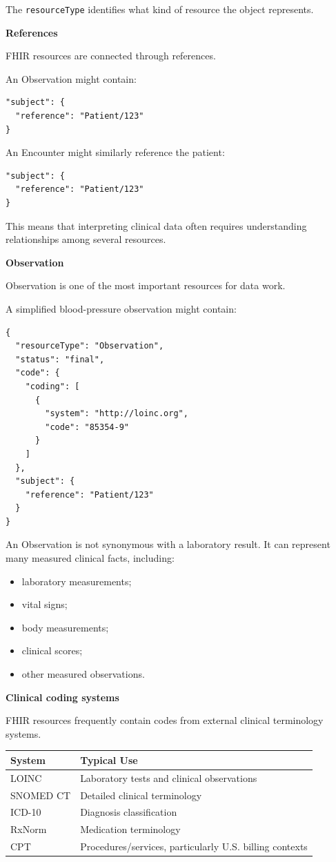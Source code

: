 \documentclass[11pt,letterpaper]{article}
\begin{document}
The \texttt{resourceType} identifies what kind of resource the object
represents.

\textbf{References}

FHIR resources are connected through references.

An Observation might contain:

\begin{lstlisting}
"subject": {
  "reference": "Patient/123"
}
\end{lstlisting}

An Encounter might similarly reference the patient:

\begin{lstlisting}
"subject": {
  "reference": "Patient/123"
}
\end{lstlisting}

This means that interpreting clinical data often requires understanding
relationships among several resources.

\textbf{Observation}

Observation is one of the most important resources for data work.

A simplified blood-pressure observation might contain:

\begin{lstlisting}
{
  "resourceType": "Observation",
  "status": "final",
  "code": {
    "coding": [
      {
        "system": "http://loinc.org",
        "code": "85354-9"
      }
    ]
  },
  "subject": {
    "reference": "Patient/123"
  }
}
\end{lstlisting}

An Observation is not synonymous with a laboratory result. It can represent
many measured clinical facts, including:

\begin{itemize}[leftmargin=*]
    \item laboratory measurements;
    \item vital signs;
    \item body measurements;
    \item clinical scores;
    \item other measured observations.
\end{itemize}

\textbf{Clinical coding systems}

FHIR resources frequently contain codes from external clinical terminology
systems.

\begin{center}
\begin{tabularx}{\textwidth}{lX}
\toprule
System & Typical Use \\
\midrule
LOINC & Laboratory tests and clinical observations \\
SNOMED CT & Detailed clinical terminology \\
ICD-10 & Diagnosis classification \\
RxNorm & Medication terminology \\
CPT & Procedures/services, particularly U.S. billing contexts \\
\bottomrule
\end{tabularx}
\end{center}
\end{document}
